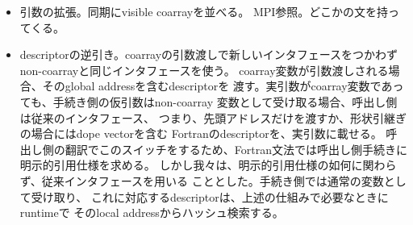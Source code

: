 \begin{itemize}
\item
引数の拡張。同期にvisible coarrayを並べる。
MPI参照。どこかの文を持ってくる。

\item
descriptorの逆引き。coarrayの引数渡しで新しいインタフェースをつかわず
non-coarrayと同じインタフェースを使う。
%
coarray変数が引数渡しされる場合、そのglobal addressを含むdescriptorを
渡す。実引数がcoarray変数であっても、手続き側の仮引数はnon-coarray
変数として受け取る場合、呼出し側は従来のインタフェース、
つまり、先頭アドレスだけを渡すか、形状引継ぎの場合にはdope vectorを含む
Fortranのdescriptorを、実引数に載せる。
呼出し側の翻訳でこのスイッチをするため、Fortran文法では呼出し側手続きに
明示的引用仕様を求める。
%
しかし我々は、明示的引用仕様の如何に関わらず、従来インタフェースを用いる
こととした。手続き側では通常の変数として受け取り、
これに対応するdescriptorは、上述の仕組みで必要なときにruntimeで
そのlocal addressからハッシュ検索する。

\end{itemize}

